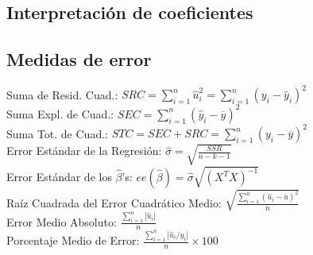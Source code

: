 \documentclass[10pt, a4paper, landscape]{extarticle}
\begin{document}
\begin{multicols}{3}
	\subsection*{Interpretación de coeficientes}
	\subsection*{Medidas de error}
		Suma de Resid. Cuad.: \hfill $SRC = \sum_{i=1}^n \hat{u}_i^2 = \sum_{i=1}^n (y_i - \hat{y}_i)^2$
		\\ Suma Expl. de Cuad.: \hfill $SEC = \sum_{i=1}^n (\hat{y}_i - \overline{y})^2$
		\\ Suma Tot. de Cuad.: \hfill $STC = SEC + SRC = \sum_{i=1}^n (y_i - \overline{y})^2$
		\\ Error Estándar de la Regresión: \hfill $\hat{\sigma} = \sqrt{\frac{SSR}{n-k-1}}$
		\\ Error Estándar de los $\hat{\beta}$'s: \hfill $ee(\hat{\beta}) = \hat{\sigma} \sqrt{(X^T X)^{-1}}$
		\\ Raíz Cuadrada del Error Cuadrático Medio: \hfill $\sqrt{\frac{\sum_{i=1}^n (\hat{u}_i - \overline{u})^2}{n}}$
		\\ Error Medio Absoluto: \hfill $\frac{\sum_{i=1}^n |\hat{u}_i|}{n}$
		\\ Porcentaje Medio de Error: \hfill $\frac{\sum_{i=1}^n |\hat{u}_i / y_i|}{n} \times 100$
\columnbreak

\end{multicols}
\end{document}
